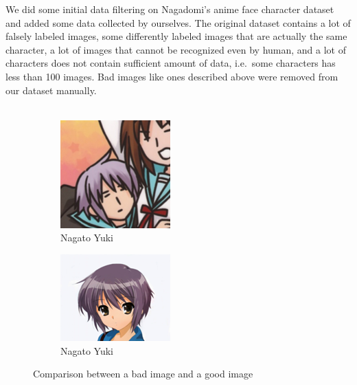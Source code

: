 \documentclass[11.5pt]{article}
\begin{document}
We did some initial data filtering on Nagadomi's anime face character dataset and added some data collected by ourselves.
The original dataset contains a lot of falsely labeled images, some differently labeled images that are actually the same character, a lot of images that cannot be recognized even by human, and a lot of characters does not contain sufficient amount of data, i.e.\ some characters has less than 100 images.
Bad images like ones described above were removed from our dataset manually.\\ \\
\begin{figure}[h!]
    \begin{subfigure}[b]{0.4\linewidth}
        \includegraphics{../data_set/moeimouto-faces/007_nagato_yuki/face_145_303_113.png}
        \caption{Nagato Yuki}
    \end{subfigure}
    \begin{subfigure}[b]{0.4\linewidth}
        \includegraphics{../data_set/moeimouto-faces/007_nagato_yuki/face_235_235_128.png}
        \caption{Nagato Yuki}
    \end{subfigure}
    \caption{Comparison between a bad image and a good image}
\end{figure}
\end{document}
